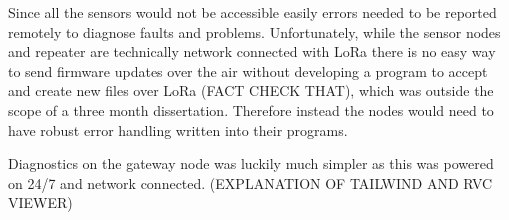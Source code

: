 Since all the sensors would not be accessible easily errors needed to be
reported remotely to diagnose faults and problems. Unfortunately, while the
sensor nodes and repeater are technically network connected with LoRa there is
no easy way to send firmware updates over the air without developing a program
to accept and create new files over LoRa (FACT CHECK THAT), which was outside
the scope of a three month dissertation. Therefore instead the nodes would need
to have robust error handling written into their programs.

Diagnostics on the gateway node was luckily much simpler as this was powered on
24/7 and network connected. (EXPLANATION OF TAILWIND AND RVC VIEWER)
